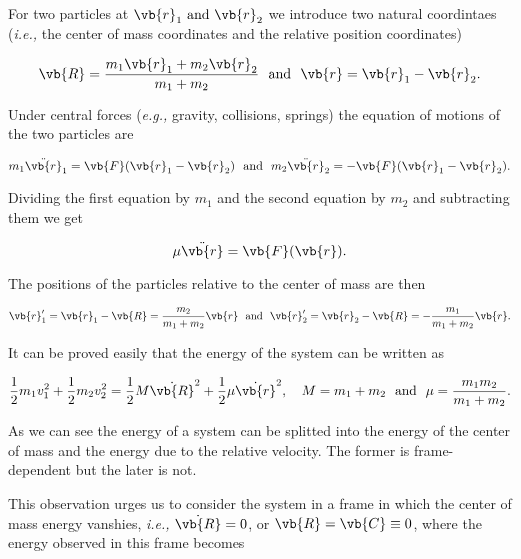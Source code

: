 \documentclass[a4paper,12pt]{report}
\begin{document}
For two particles at \(\vb{r} _{1} \text { and } \vb{r} _{2}  \) we introduce two natural coordintaes (\textit{i.e.,} the center of mass coordinates and the relative position coordinates)

\begin{equation}
	\vb{R} = \frac{m_1 \vb{r} _{1} + m_2 \vb{r} _{2}  }{m_1 + m_2 } ~\text { and }~ \vb{r} = \vb{r} _{1} - \vb{r} _{2}  .   
\end{equation}

Under central forces (\textit{e.g.,} gravity, collisions, springs) the equation of motions of the two particles are 

\begin{equation}
	m_1 \ddot{\vb{r}}_{1} = \vb{F} (\vb{r} _{1}-\vb{r} _{2}  ) ~\text { and }~ m_2 \ddot{\vb{r} }_{2} = - \vb{F} (\vb{r} _{1}-\vb{r} _{2}  ).     
\end{equation}

Dividing the first equation by \(m_1 \) and the second equation by \(m_2 \) and subtracting them we get 

\begin{equation}
	\mu \ddot{\vb{r} } = \vb{F} (\vb{r} ). 
\end{equation}

The positions of the particles relative to the center of mass are then 

\begin{equation}
	\vb{r} _{1}' = \vb{r} _{1} - \vb{R} = \frac{m_2 }{m_1 +m_2 }\vb{r} ~\text { and }~ \vb{r} _{2}' = \vb{r} _{2} - \vb{R} = -\frac{m_1 }{m_1 +m_2 } \vb{r}  .
\end{equation}

It can be proved easily that the energy of the system can be written as 

\begin{equation}
	\frac{1}{2}m_1v_1 ^2 + \frac{1}{2}m_2 v_2 ^2 = \frac{1}{2} M \dot{\vb{R} } ^2 + \frac{1}{2} \mu \dot{\vb{r} }^2, \quad M = m_1 +m_2 ~\text { and }~ \mu = \frac{m_1 m_2 }{m_1 +m_2 }.     
\end{equation}

As we can see the energy of a system can be splitted into the energy of the center of mass and the energy due to the relative velocity. The former is frame-dependent but the later is not. 

This observation urges us to consider the system in a frame in which the center of mass energy vanshies, \textit{i.e.,} \(\dot{\vb{R} } = 0\), or \(\vb{R} = \vb{C} \equiv 0\), where the energy observed in this frame becomes
\end{document}
